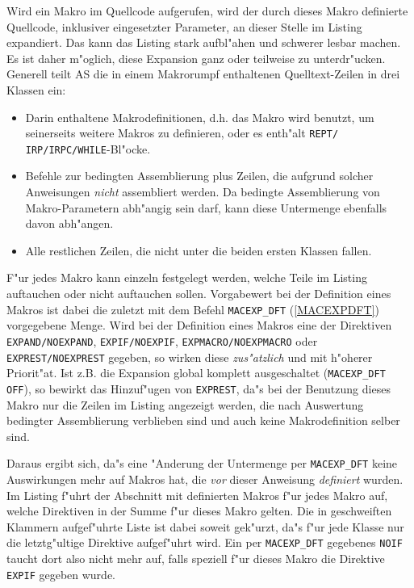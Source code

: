 \documentclass[12pt,a4paper,twoside]{report}
\newcommand{\tty}[1]{{\tt #1}}
\newcommand{\asname}{AS}
\begin{document}
Wird ein Makro im Quellcode aufgerufen, wird der durch dieses Makro definierte
Quellcode, inklusiver eingesetzter Parameter, an dieser Stelle im Listing
expandiert.  Das kann das Listing stark aufbl"ahen und schwerer lesbar
machen.  Es ist daher m"oglich, diese Expansion ganz oder teilweise zu
unterdr"ucken.  Generell teilt \asname{} die in einem Makrorumpf enthaltenen
Quelltext-Zeilen in drei Klassen ein:
\begin{itemize}
\item{Darin enthaltene Makrodefinitionen, d.h. das Makro wird benutzt, um
      seinerseits weitere Makros zu definieren, oder es enth"alt \tty{REPT/
      IRP/IRPC/WHILE}-Bl"ocke.}
\item{Befehle zur bedingten Assemblierung plus Zeilen, die aufgrund
      solcher Anweisungen {\it nicht} assembliert werden.  Da bedingte
      Assemblierung von Makro-Parametern abh"angig sein darf, kann diese
      Untermenge ebenfalls davon abh"angen.}
\item{Alle restlichen Zeilen, die nicht unter die beiden ersten Klassen
      fallen.}
\end{itemize}
F"ur jedes Makro kann einzeln festgelegt werden, welche Teile im Listing
auftauchen oder nicht auftauchen sollen.  Vorgabewert bei der Definition
eines Makros ist dabei die zuletzt mit dem Befehl \tty{MACEXP\_DFT}
(\ref{MACEXPDFT}) vorgegebene Menge.  Wird bei der Definition eines
Makros eine der Direktiven \tty{EXPAND/NOEXPAND}, \tty{EXPIF/NOEXPIF},
\tty{EXPMACRO/NOEXPMACRO} oder \tty{EXPREST/NOEXPREST} gegeben, so wirken
diese {\it zus"atzlich} und mit h"oherer Priorit"at.  Ist z.B. die Expansion
global komplett ausgeschaltet (\tty{MACEXP\_DFT OFF}), so bewirkt das
Hinzuf"ugen von \tty{EXPREST}, da"s bei der Benutzung dieses Makro nur
die Zeilen im Listing angezeigt werden, die nach Auswertung bedingter
Assemblierung verblieben sind und auch keine Makrodefinition selber sind.

Daraus ergibt sich, da"s eine "Anderung der Untermenge per \tty{MACEXP\_DFT}
keine Auswirkungen mehr auf Makros hat, die {\it vor} dieser Anweisung
{\it definiert} wurden.  Im Listing f"uhrt der Abschnitt mit definierten Makros
f"ur jedes Makro auf, welche Direktiven in der Summe f"ur dieses Makro
gelten.  Die in geschweiften Klammern aufgef"uhrte Liste ist dabei soweit
gek"urzt, da"s f"ur jede Klasse nur die letztg"ultige Direktive aufgef"uhrt
wird.  Ein per \tty{MACEXP\_DFT} gegebenes \tty{NOIF} taucht dort also
nicht mehr auf, falls speziell f"ur dieses Makro die Direktive \tty{EXPIF}
gegeben wurde.
\end{document}
